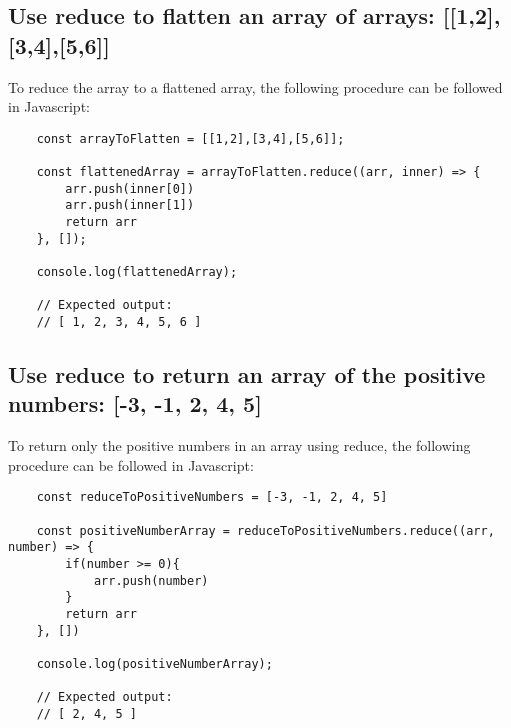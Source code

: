 \documentclass{article}
\begin{document}
\subsection{Use reduce to flatten an array of arrays: [[1,2],[3,4],[5,6]]}
\lstset{language=Java}
To reduce the array to a flattened array, the following procedure can be followed in Javascript:
\begin{lstlisting}
    const arrayToFlatten = [[1,2],[3,4],[5,6]];

    const flattenedArray = arrayToFlatten.reduce((arr, inner) => {
        arr.push(inner[0])
        arr.push(inner[1])
        return arr
    }, []);

    console.log(flattenedArray);

    // Expected output:
    // [ 1, 2, 3, 4, 5, 6 ]

\end{lstlisting}

\subsection{Use reduce to return an array of the positive numbers: [-3, -1, 2, 4, 5]}
\lstset{language=Java}
To return only the positive numbers in an array using reduce, the following procedure can be followed in Javascript:
\begin{lstlisting}
    const reduceToPositiveNumbers = [-3, -1, 2, 4, 5]

    const positiveNumberArray = reduceToPositiveNumbers.reduce((arr, number) => {
        if(number >= 0){
            arr.push(number)
        }
        return arr
    }, [])

    console.log(positiveNumberArray);

    // Expected output:
    // [ 2, 4, 5 ]

\end{lstlisting}


\newpage

{}

\end{document}
